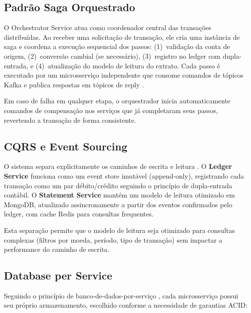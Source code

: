 \documentclass[12pt]{article}
\begin{document}
\subsection{Padr\~{a}o Saga Orquestrado}

O Orchestrator Service atua como coordenador central das transa\c{c}\~{o}es distribu\'{i}das. Ao receber uma solicita\c{c}\~{a}o de transa\c{c}\~{a}o, ele cria uma inst\^{a}ncia de saga e coordena a execu\c{c}\~{a}o sequencial dos passos: (1)~valida\c{c}\~{a}o da conta de origem, (2)~convers\~{a}o cambial (se necess\'{a}rio), (3)~registro no ledger com dupla-entrada, e (4)~atualiza\c{c}\~{a}o do modelo de leitura do extrato. Cada passo \'{e} executado por um microsservi\c{c}o independente que consome comandos de t\'{o}picos Kafka e publica respostas em t\'{o}picos de reply \cite{richardson2018}.

Em caso de falha em qualquer etapa, o orquestrador inicia automaticamente comandos de compensa\c{c}\~{a}o nos servi\c{c}os que j\'{a} completaram seus passos, revertendo a transa\c{c}\~{a}o de forma consistente.

\subsection{CQRS e Event Sourcing}

O sistema separa explicitamente os caminhos de escrita e leitura \cite{kleppmann2017}. O \textbf{Ledger Service} funciona como um event store imut\'{a}vel (append-only), registrando cada transa\c{c}\~{a}o como um par d\'{e}bito/cr\'{e}dito seguindo o princ\'{i}pio de dupla-entrada cont\'{a}bil. O \textbf{Statement Service} mant\'{e}m um modelo de leitura otimizado em MongoDB, atualizado assincronamente a partir dos eventos confirmados pelo ledger, com cache Redis para consultas frequentes.

Esta separa\c{c}\~{a}o permite que o modelo de leitura seja otimizado para consultas complexas (filtros por moeda, per\'{i}odo, tipo de transa\c{c}\~{a}o) sem impactar a performance do caminho de escrita.

\subsection{Database per Service}

Seguindo o princ\'{i}pio de banco-de-dados-por-servi\c{c}o \cite{newman2015}, cada microsservi\c{c}o possui seu pr\'{o}prio armazenamento, escolhido conforme a necessidade de garantias ACID:
\end{document}
